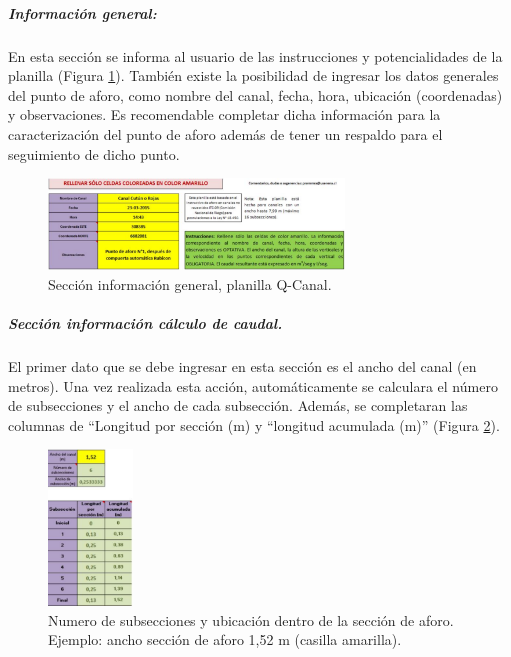 \documentclass[]{article}
\begin{document}
\subparagraph{Información general:}
En esta sección se informa al usuario de las instrucciones y potencialidades de la planilla (Figura \ref{info_general}). También existe la posibilidad de ingresar los datos generales del punto de aforo, como nombre del canal, fecha, hora, ubicación (coordenadas) y observaciones. Es recomendable completar dicha información para la caracterización del punto de aforo además de tener un respaldo para el seguimiento de dicho punto.

\begin{figure}[h]
\centering
\includegraphics[width=0.7\textwidth]{images/info_general.eps}
\caption{Sección información general, planilla Q-Canal.}
\label{info_general}
\end{figure}

\subparagraph{Sección información cálculo de caudal.}
El primer dato que se debe ingresar en esta sección es el ancho del canal (en metros). Una vez realizada esta acción, automáticamente se calculara el número de subsecciones y el ancho de cada subsección. Además, se completaran las columnas de “Longitud por sección (m) y “longitud acumulada (m)” (Figura \ref{casilla}).

\begin{figure}[h]
\centering
\includegraphics[width=0.2\textwidth]{images/n_subsecciones.eps}
\caption{Numero de subsecciones y ubicación dentro de la sección de aforo. Ejemplo: ancho sección de aforo 1,52 m (casilla amarilla).}
\label{casilla}
\end{figure}
\end{document}
